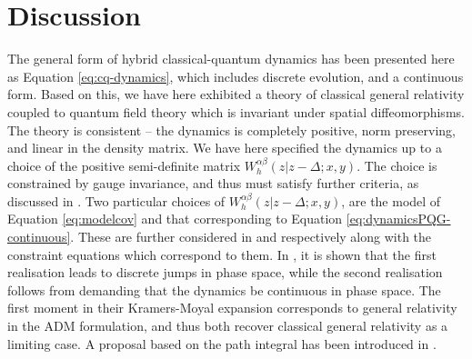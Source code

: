 \documentclass[aps,pra,showpacs,citeautoscript,amsmath,amssymb,floatfix,superscriptaddress,bbm, verbatim,amsfonts,changes,12pt,nofootinbib,longbibliography]{revtex4-2}
\def\z{{z}}
\def\dist{{\Delta}}
\def\rate{{W}}
\def\ab{^{\alpha\beta}}
\begin{document}
\section{Discussion}
\label{sec:discussion}

The general form of hybrid classical-quantum dynamics has been presented here as Equation \eqref{eq:cq-dynamics}, which includes discrete evolution, and a continuous form\cite{UCLPawula}. Based on this, we have here exhibited a theory of classical general relativity coupled to quantum field theory which is invariant under spatial diffeomorphisms. The theory is consistent -- the dynamics is completely positive, norm preserving, and linear in the density matrix. We have here specified the dynamics up to a choice of the positive semi-definite matrix $\rate\ab_{h}(\z|\z-\dist;x,y)$.
The choice is constrained by gauge invariance, and thus must satisfy further criteria, as discussed in \cite{UCL2022constraints}. Two particular choices of $\rate\ab_{h}(\z|\z-\dist;x,y)$, are the model of Equation \eqref{eq:modelcov} and that corresponding to Equation \eqref{eq:dynamicsPQG-continuous}. These are further considered in \cite{UCL2022constraints} and \cite{oppenheim2021gravitationally,oppenheim2021constraints} respectively along with the constraint equations which correspond to them.
In \cite{UCLPawula}, it is shown that the first realisation leads to discrete jumps in phase space, while the second realisation follows from demanding that the dynamics be continuous in phase space.  The first moment in their Kramers-Moyal expansion corresponds to general relativity in the ADM formulation, and thus both recover classical general relativity as a limiting case. \label{par:realisations}  A proposal based on the path integral has been introduced in \cite{oppenheim2023covariant}.
\end{document}
